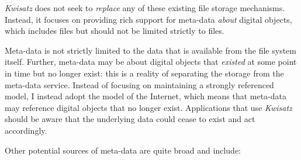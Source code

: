 \documentclass[sigconf,anonymous,review]{acmart}
\newcommand{\system}[0]{\emph{Kwisatz}\xspace}
\begin{document}
\system does not seek to \emph{replace} any of these existing file storage
mechanisms.  Instead, it focuses on providing rich support for meta-data
\emph{about} digital objects, which includes files but should not be limited
strictly to files.

Meta-data is not strictly limited to the data that is available from the file
system itself.  Further, meta-data may be about digital objects that
\emph{existed} at some point in time but no longer exist: this is a reality of
separating the storage from the meta-data service. Instead of focusing on
maintaining a strongly referenced model, I instead adopt the model of the
Internet, which means that meta-data may reference digital objects that no
longer exist.  Applications that use \system should be aware that the underlying
data could cease to exist and act accordingly.

Other potential sources of meta-data are quite broad and include:
\end{document}
